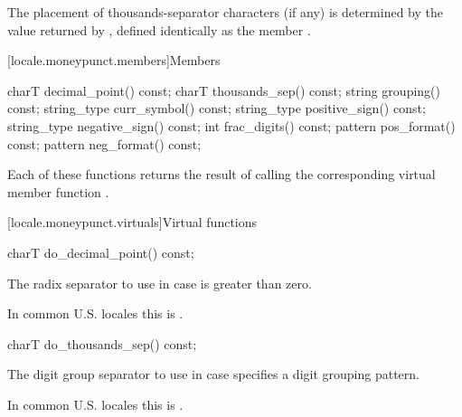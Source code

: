 \pnum
The placement of thousands-separator characters (if any)
is determined by the value returned by ,
defined identically as the member .

[locale.moneypunct.members]{Members}

%
%
%
%
%
%
%
%
%
\begin{codeblock}
charT        decimal_point() const;
charT        thousands_sep() const;
string       grouping()      const;
string_type  curr_symbol()   const;
string_type  positive_sign() const;
string_type  negative_sign() const;
int          frac_digits()   const;
pattern      pos_format()    const;
pattern      neg_format()    const;
\end{codeblock}

\pnum
Each of these functions 
returns the result of calling the corresponding
virtual member function
.

[locale.moneypunct.virtuals]{Virtual functions}

%
\begin{itemdecl}
charT do_decimal_point() const;
\end{itemdecl}

\begin{itemdescr}
\pnum
\returns
The radix separator to use
in case  is greater than zero.
\begin{footnote}
In common U.S. locales this is .
\end{footnote}
\end{itemdescr}

%
\begin{itemdecl}
charT do_thousands_sep() const;
\end{itemdecl}

\begin{itemdescr}
\pnum
\returns
The digit group separator to use
in case  specifies a digit grouping pattern.
\begin{footnote}
In common U.S. locales this is .
\end{footnote}
\end{itemdescr}

